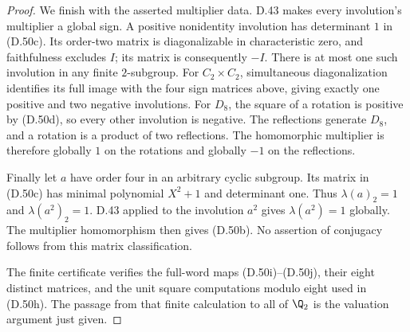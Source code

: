 \begin{proof}
We finish with the asserted multiplier data.
D.43 makes every involution's multiplier a
global sign. A positive nonidentity involution
has determinant $1$ in (D.50c). Its order-two
matrix is diagonalizable in characteristic
zero, and faithfulness excludes $I$; its matrix
is consequently $-I$.
There is at most one such involution in any
finite $2$-subgroup.
For $C_2\times C_2$, simultaneous diagonalization
identifies its full image with the four sign
matrices above, giving exactly one positive
and two negative involutions.
For $D_8$, the square of a rotation is
positive by (D.50d), so every other involution
is negative. The reflections generate $D_8$,
and a rotation is a product of two reflections.
The homomorphic multiplier is therefore
globally $1$ on the rotations and globally
$-1$ on the reflections.

Finally let $a$ have order four in an arbitrary
cyclic subgroup. Its matrix in (D.50c) has
minimal polynomial $X^2+1$ and determinant one.
Thus $\lambda(a)_2=1$ and $\lambda(a^2)_2=1$.
D.43 applied to the involution $a^2$ gives
$\lambda(a^2)=1$ globally. The multiplier
homomorphism then gives (D.50b).
No assertion of conjugacy follows from this
matrix classification.

The finite certificate
verifies the full-word maps (D.50i)--(D.50j),
their eight distinct matrices, and the unit
square computations modulo eight used in
(D.50h). The passage from that finite
calculation to all of $\Q_2$ is the valuation
argument just given.
\end{proof}
